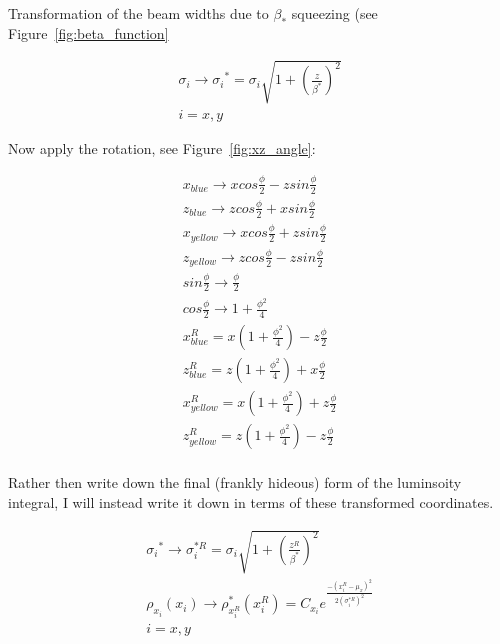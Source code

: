 Transformation of the beam widths due to $\beta_{*}$ squeezing (see
Figure~\ref{fig:beta_function}

\begin{gather}
  \label{eq:beta_star_transform}
  \sigma_{i} \rightarrow {{\sigma}_{i}}^{*} =
  \sigma_{i}\sqrt{1+{\left(\frac{z}{\beta^{*}} \right)}^{2} } \\
  i = x, y
\end{gather}


Now apply the rotation, see Figure~\ref{fig:xz_angle}:

\begin{gather}
  \label{eq:transformations}
  x_{blue}   \rightarrow x cos \frac{\phi}{2} - z sin \frac{\phi}{2} \\
  z_{blue}   \rightarrow z cos \frac{\phi}{2} + x sin \frac{\phi}{2} \\
  x_{yellow} \rightarrow x cos \frac{\phi}{2} + z sin \frac{\phi}{2} \\
  z_{yellow} \rightarrow z cos \frac{\phi}{2} - z sin \frac{\phi}{2} \\
  sin \frac {\phi}{2} \rightarrow \frac{\phi}{2} \\
  cos \frac {\phi}{2} \rightarrow 1 + \frac{\phi^2}{4} \\
  x_{blue}^{R}  = x\left(1+\frac{{\phi}^{2}}{4}\right)- z \frac{\phi}{2} \\
  z_{blue}^{R}  = z\left(1+\frac{{\phi}^{2}}{4}\right)+ x \frac{\phi}{2} \\
  x_{yellow}^{R}= x\left(1+\frac{{\phi}^{2}}{4}\right)+ z \frac{\phi}{2} \\
  z_{yellow}^{R}= z\left(1+\frac{{\phi}^{2}}{4}\right)- z \frac{\phi}{2} \\
\end{gather}

Rather then write down the final (frankly hideous) form of the luminsoity
integral, I will instead write it down in terms of these transformed
coordinates.

\begin{gather}
  \label{eq:final_luminosity}
  {{\sigma}_{i}}^{*} \rightarrow \sigma_{i}^{*R} =
  \sigma_{i}\sqrt{1+{\left(\frac{z^{R}}{\beta^{*}} \right)}^{2} } \\
  \rho_{x_i}(x_{i}) \rightarrow \rho_{x_{i}^{R}}^{*}(x_{i}^{R}) = C_{x_{i}}{e}^{\frac{-{\left(x_{i}^{R}-\mu_{x}\right)}^2}{2{\left(\sigma_{i}^{*R}\right)}^2}} \\
  i = x,y \\
\end{gather}

